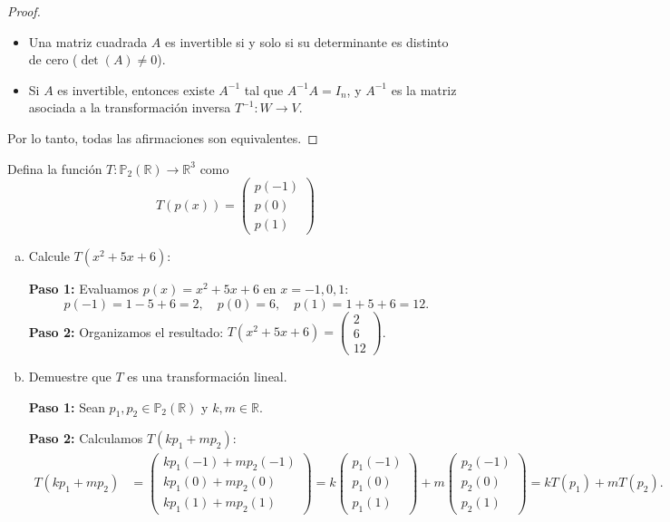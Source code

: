 \begin{theorem}
\begin{proof}
\begin{itemize}
    \item[$4 \iff 5$:] Una matriz cuadrada $A$ es invertible si y solo si su determinante es distinto de cero ($\det(A) \neq 0$).

    \item[$4 \iff 6$:] Si $A$ es invertible, entonces existe $A^{-1}$ tal que $A^{-1}A = I_n$, y $A^{-1}$ es la matriz asociada a la transformación inversa $T^{-1}: W \to V$.
\end{itemize}
Por lo tanto, todas las afirmaciones son equivalentes.
\end{proof}
\end{theorem}

\begin{example}
Defina la función $T: \mathbb{P}_2(\mathbb{R}) \to \mathbb{R}^3$ como
\[
T(p(x)) = \begin{pmatrix} p(-1) \\ p(0) \\ p(1) \end{pmatrix}
\]
\begin{enumerate}[a.]
    \item Calcule $T(x^2 + 5x + 6)$:
    \begin{myproof}
    \textbf{Paso 1:} Evaluamos $p(x)=x^2+5x+6$ en $x=-1,0,1$:
    \[
    p(-1)=1-5+6=2,\quad p(0)=6,\quad p(1)=1+5+6=12.
    \]
    \textbf{Paso 2:} Organizamos el resultado: $\boxed{T(x^2+5x+6) = \begin{pmatrix} 2 \\ 6 \\ 12 \end{pmatrix}}$.
    \end{myproof}
    \item Demuestre que $T$ es una transformación lineal.
    \begin{myproof}
    \textbf{Paso 1:} Sean $p_1, p_2 \in \mathbb{P}_2(\mathbb{R})$ y $k, m \in \mathbb{R}$.

    \textbf{Paso 2:} Calculamos $T(kp_1+mp_2)$:
    \begin{align*}
        T(k p_1 + m p_2) &= \begin{pmatrix}
            k p_1(-1) + m p_2(-1) \\
            k p_1(0) + m p_2(0) \\
            k p_1(1) + m p_2(1)
        \end{pmatrix}
        = k \begin{pmatrix} p_1(-1) \\ p_1(0) \\ p_1(1) \end{pmatrix} + m \begin{pmatrix} p_2(-1) \\ p_2(0) \\ p_2(1) \end{pmatrix}
        = kT(p_1) + mT(p_2).
    \end{align*}


\end{myproof}
\end{enumerate}
\end{example}
